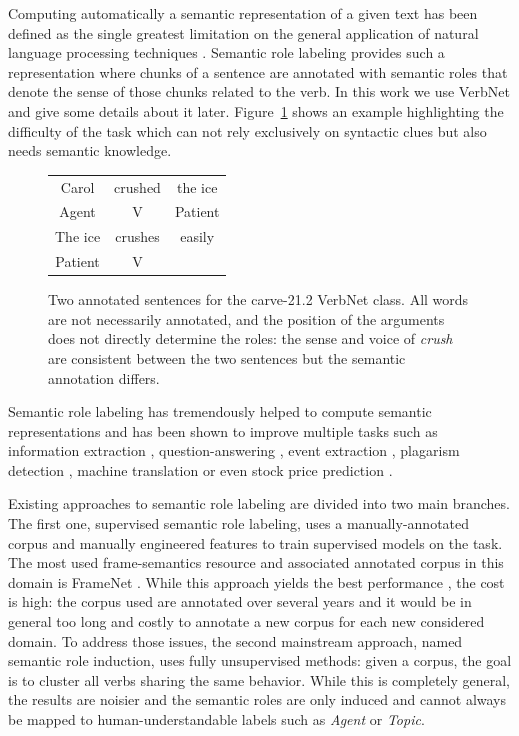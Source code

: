 Computing automatically a semantic representation of a given text has been
defined as the single greatest limitation on the general application of natural
language processing techniques \citep{dang1998investigating}. Semantic role
labeling provides such a representation where chunks of a sentence are
annotated with semantic roles that denote the sense of those chunks related to
the verb. In this work we use VerbNet \citep{kipper2006extending} and give
some details about it later. Figure~\ref{fig:example_srl} shows an example
highlighting the difficulty of the task which can not rely exclusively on
syntactic clues but also needs semantic knowledge.

\begin{figure}[ht]
    \centering
    \begin{tabular}{ccc}
        \toprule
        Carol & crushed   & the ice \\
        Agent & V         & Patient \\
        \midrule
        The ice & crushes & easily  \\
        Patient & V       &         \\
        \bottomrule
    \end{tabular}
    \caption{\label{fig:example_srl}Two annotated sentences for the carve-21.2 VerbNet class. All words are not necessarily annotated, and the position of the arguments does not directly determine the roles: the sense and voice of \textit{crush} are consistent between the two sentences but the semantic annotation differs.}
\end{figure}

Semantic role labeling has tremendously helped to compute semantic
representations and has been shown to improve multiple tasks such as
information extraction \citep{surdeanu2003using}, question-answering
\citep{shen2007using}, event extraction \citep{exner2011using},
plagarism detection \citep{osman2012improved}, machine translation
\citep{bazrafshan2013semantic} or even stock price prediction
\citep{xie2013semantic}.

Existing approaches to semantic role labeling are divided into two main
branches. The first one, supervised semantic role labeling, uses a
manually-annotated corpus and manually engineered features to train supervised
models on the task. The most used frame-semantics resource and associated
annotated corpus in this domain is FrameNet \citep{baker1998berkeley}.
While this approach yields the best performance \citep{das2013frame}, the
cost is high: the corpus used are annotated over several years and it would be
in general too long and costly to annotate a new corpus for each new considered
domain. To address those issues, the second mainstream approach, named semantic
role induction, uses fully unsupervised methods: given a corpus, the goal is to
cluster all verbs sharing the same behavior. While this is completely general,
the results are noisier and the semantic roles are only induced and cannot
always be mapped to human-understandable labels such as \textit{Agent} or
\textit{Topic}.

